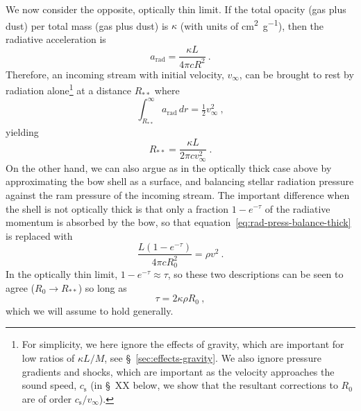 \message{ !name(dusty-bow-wave.tex)}\documentclass[useAMS, usenatbib, a4paper]{mnras}
\newcommand\sound{\ensuremath{c_{\text{s}}}}
\newcommand\starstar{\ensuremath{_{**}}}
\begin{document}
We now consider the opposite, optically thin limit.  If the total
opacity (gas plus dust) per total mass (gas plus dust) is \(\kappa\) (with
units of \si{cm^2.g^{-1}}), then the radiative acceleration is
\begin{equation}
  \label{eq:rad-accel}
  a_{\text{rad}} = \frac{\kappa L}{4 \pi c R^2} \ .
\end{equation}
Therefore, an incoming stream with initial velocity, \(v_\infty\), can be
brought to rest by radiation alone\footnote{%
  For simplicity, we here ignore the effects of gravity, which are
  important for low ratios of \(\kappa L / M\), see
  \S~\ref{sec:effects-gravity}.  We also ignore pressure gradients and
  shocks, which are important as the velocity approaches the sound
  speed, \(\sound\) (in \S~XX below, we show that the resultant
  corrections to \(R_0\) are of order \(\sound / v_\infty\)).} %
at a distance \(R\starstar\) where
\begin{equation}
  \label{eq:rad-poten}
  \int_{R\starstar}^\infty a_{\text{rad}} \, dr = \tfrac12 v_\infty^2 \ , 
\end{equation}
yielding
\begin{equation}
  \label{eq:rad:R0}
  R\starstar = \frac{\kappa L}{2\pi c v_\infty^2} \ .
\end{equation}
On the other hand, we can also argue as in the optically thick case
above by approximating the bow shell as a surface, and balancing
stellar radiation pressure against the ram pressure of the incoming
stream.  The important difference when the shell is not optically
thick is that only a fraction \(1 - e^{-\tau}\) of the radiative momentum
is absorbed by the bow, so that
equation~\eqref{eq:rad-press-balance-thick} is replaced with
\begin{equation}
  \label{eq:rad-press-balance-tau}
  \frac{L (1 - e^{-\tau})}{4 \pi c R_0^2} = \rho v^2 \ .
\end{equation}
In the optically thin limit, \(1 - e^{-\tau} \approx \tau\), so these two
descriptions can be seen to agree (\(R_0 \to R\starstar\)) so long as
\begin{equation}
  \label{eq:tau-thin}
  \tau = 2 \kappa \rho R_0 \ ,
\end{equation}
which we will assume to hold generally.
\end{document}
